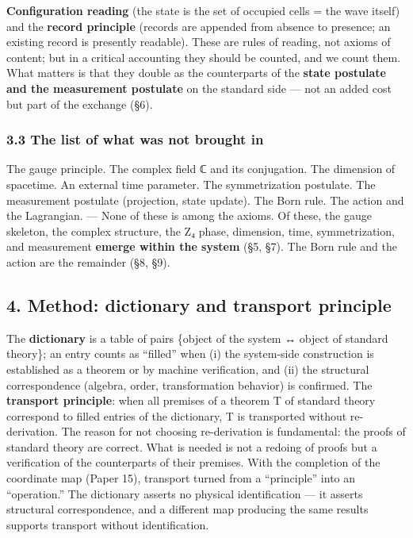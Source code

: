 \documentclass[
]{article}
\begin{document}
\textbf{Configuration reading} (the state is the set of occupied cells =
the wave itself) and the \textbf{record principle} (records are appended
from absence to presence; an existing record is presently readable).
These are rules of reading, not axioms of content; but in a critical
accounting they should be counted, and we count them. What matters is
that they double as the counterparts of the \textbf{state postulate and
the measurement postulate} on the standard side --- not an added cost
but part of the exchange (§6).

\subsubsection{3.3 The list of what was not brought
in}\label{the-list-of-what-was-not-brought-in}

The gauge principle. The complex field ℂ and its conjugation. The
dimension of spacetime. An external time parameter. The symmetrization
postulate. The measurement postulate (projection, state update). The
Born rule. The action and the Lagrangian. --- None of these is among the
axioms. Of these, the gauge skeleton, the complex structure, the Z₄
phase, dimension, time, symmetrization, and measurement \textbf{emerge
within the system} (§5, §7). The Born rule and the action are the
remainder (§8, §9).

\subsection{4. Method: dictionary and transport
principle}\label{method-dictionary-and-transport-principle}

The \textbf{dictionary} is a table of pairs \{object of the system ↔
object of standard theory\}; an entry counts as ``filled'' when (i) the
system-side construction is established as a theorem or by machine
verification, and (ii) the structural correspondence (algebra, order,
transformation behavior) is confirmed. The \textbf{transport principle}:
when all premises of a theorem T of standard theory correspond to filled
entries of the dictionary, T is transported without re-derivation. The
reason for not choosing re-derivation is fundamental: the proofs of
standard theory are correct. What is needed is not a redoing of proofs
but a verification of the counterparts of their premises. With the
completion of the coordinate map (Paper 15), transport turned from a
``principle'' into an ``operation.'' The dictionary asserts no physical
identification --- it asserts structural correspondence, and a different
map producing the same results supports transport without
identification.
\end{document}
